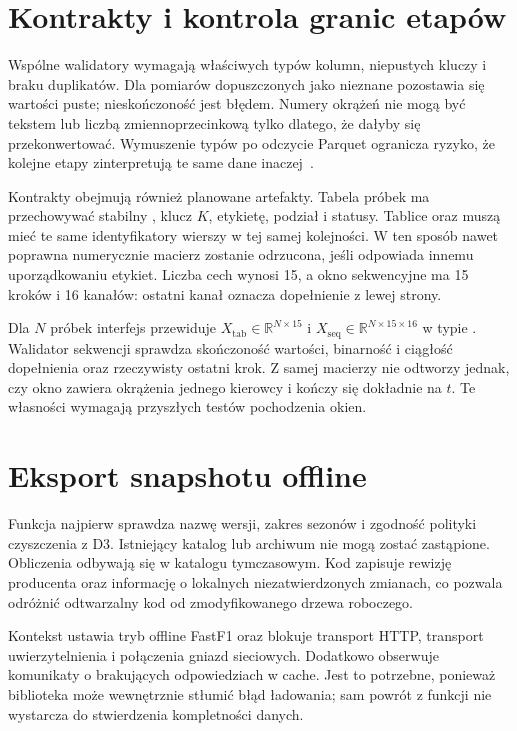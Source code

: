 \label{ch:implementation}

\section{Kontrakty i kontrola granic etapów}

Wspólne walidatory wymagają właściwych typów kolumn, niepustych kluczy
i braku duplikatów. Dla pomiarów dopuszczonych jako nieznane pozostawia
się wartości puste; nieskończoność jest błędem. Numery okrążeń nie mogą
być tekstem lub liczbą zmiennoprzecinkową tylko dlatego, że dałyby się
przekonwertować. Wymuszenie typów po odczycie Parquet ogranicza ryzyko,
że kolejne etapy zinterpretują te same dane inaczej~\cite{contracts}.

Kontrakty obejmują również planowane artefakty. Tabela próbek ma
przechowywać stabilny , klucz $K$, etykietę, podział i statusy.
Tablice  oraz  muszą mieć te same
identyfikatory wierszy w tej samej kolejności. W ten sposób nawet poprawna
numerycznie macierz zostanie odrzucona, jeśli odpowiada innemu uporządkowaniu
etykiet. Liczba cech wynosi 15, a okno sekwencyjne ma 15 kroków i 16 kanałów:
ostatni kanał  oznacza dopełnienie z lewej strony.

Dla $N$ próbek interfejs przewiduje $X_{\mathrm{tab}}\in
\mathbb{R}^{N\times15}$ i $X_{\mathrm{seq}}\in
\mathbb{R}^{N\times15\times16}$ w typie .
Walidator sekwencji sprawdza skończoność wartości, binarność i ciągłość
dopełnienia oraz rzeczywisty ostatni krok. Z samej macierzy nie odtworzy
jednak, czy okno zawiera okrążenia jednego kierowcy i kończy się dokładnie
na $t$. Te własności wymagają przyszłych testów pochodzenia okien.

\section{Eksport snapshotu offline}

Funkcja  najpierw sprawdza nazwę wersji, zakres
sezonów i zgodność polityki czyszczenia z D3. Istniejący katalog lub
archiwum nie mogą zostać zastąpione. Obliczenia odbywają się w katalogu
tymczasowym. Kod zapisuje rewizję producenta oraz informację o lokalnych
niezatwierdzonych zmianach, co pozwala odróżnić odtwarzalny kod od
zmodyfikowanego drzewa roboczego.

Kontekst  ustawia tryb offline FastF1 oraz blokuje
transport HTTP, transport uwierzytelnienia i połączenia gniazd sieciowych.
Dodatkowo  obserwuje komunikaty o brakujących
odpowiedziach w cache. Jest to potrzebne, ponieważ biblioteka może
wewnętrznie stłumić błąd ładowania; sam powrót z funkcji nie wystarcza
do stwierdzenia kompletności danych.

